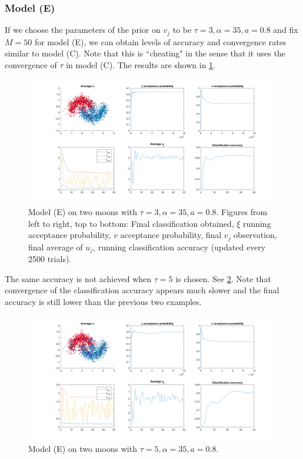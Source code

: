 \documentclass{siamart1116}
\begin{document}
        \subsubsection{Model (E)}
            If we choose the parameters of the prior on $v_j$ to be $\tau = 3, \alpha = 35, a=0.8$ and fix $M=50$ for model (E), we can obtain levels of accuracy and convergence rates similar to model (C). Note that this is ``cheating" in the sense that it uses the convergence of $\tau$ in model (C). The results are shown in \cref{fig:model_e_two_moons_t=3}.

            \begin{figure}[!htb]
                \centering
                \caption{\label{fig:model_e_two_moons_t=3}Model (E) on two moons with $\tau=3,\alpha=35,a=0.8$. Figures from left to right, top to bottom: Final classification obtained, $\xi$ running acceptance probability, $v$ acceptance probability, final $v_j$ observation, final average of $u_j$, running classification accuracy (updated every 2500 trials).}
                \includegraphics[width=0.8\linewidth]{model_c_vs_model_e/moons/learn_v/t=3.png}
            \end{figure}

            The same accuracy is not achieved when $\tau=5$ is chosen. See \cref{fig:model_e_two_moons_t=5}. Note that convergence of the classification accuracy appears much slower and the final accuracy is still lower than the previous two examples.

            \begin{figure}[!htb]
                \centering
                \caption{\label{fig:model_e_two_moons_t=5}Model (E) on two moons with $\tau=5,\alpha=35,a=0.8$.}
                \includegraphics[width=0.8\linewidth]{model_c_vs_model_e/moons/learn_v/t=5.png}
            \end{figure}
\end{document}
